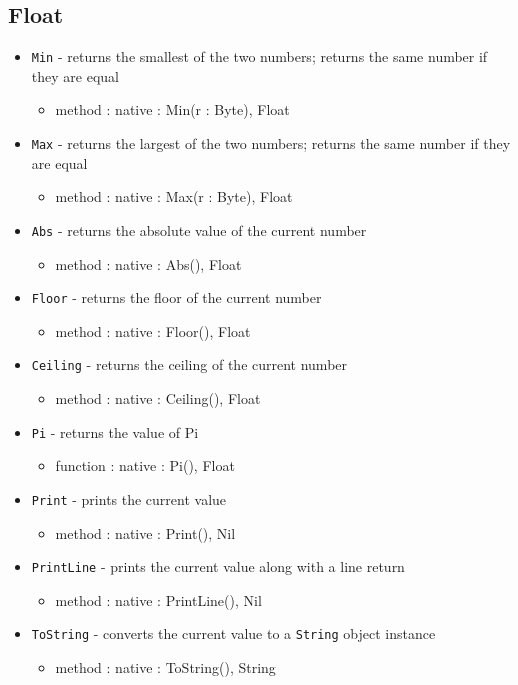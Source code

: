 \documentclass[12pt]{article}
\begin{document}
\subsection{Float}
\begin{itemize}
    \item \texttt{Min} - returns the smallest of the two numbers; returns the same number if they are equal
    	\begin{itemize}
	\item method : native : Min(r : Byte), Float
	\end{itemize}
    \item \texttt{Max} - returns the largest of the two numbers; returns the same number if they are equal
    	\begin{itemize}
	\item method : native : Max(r : Byte), Float
	\end{itemize}
    \item \texttt{Abs} - returns the absolute value of the current number
    	\begin{itemize}
	\item method : native : Abs(), Float
	\end{itemize}
    \item \texttt{Floor} - returns the floor of the current number
    	\begin{itemize}
	\item method : native : Floor(), Float
	\end{itemize}
    \item \texttt{Ceiling} - returns the ceiling of the current number
    	\begin{itemize}
	\item method : native : Ceiling(), Float
	\end{itemize}
    \item \texttt{Pi} - returns the value of Pi
    	\begin{itemize}
	\item function : native : Pi(), Float
	\end{itemize}
    \item \texttt{Print} - prints the current value
    	\begin{itemize}
	\item method : native : Print(), Nil
	\end{itemize}
    \item \texttt{PrintLine} - prints the current value along with a line return
    	\begin{itemize}
	\item method : native : PrintLine(), Nil
	\end{itemize}
    \item \texttt{ToString} - converts the current value to a \texttt{String} object instance
   	\begin{itemize}
	\item method : native : ToString(), String
	\end{itemize}
\end{itemize}
\end{document}

